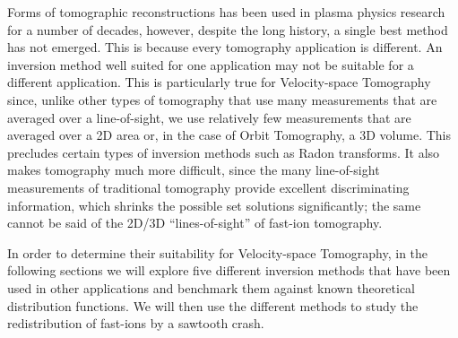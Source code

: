 Forms of tomographic reconstructions has been used in plasma physics research for a number of decades, however,
despite the long history, a single best method has not emerged. This is because every tomography application is different. An inversion method well suited for one application may not be suitable for a different application. This is particularly true for Velocity-space Tomography since, unlike other types of tomography that use many measurements that are averaged over a line-of-sight, we use relatively few measurements that are averaged over a 2D area or, in the case of Orbit Tomography, a 3D volume. This precludes certain types of inversion methods such as Radon transforms. It also makes tomography much more difficult, since the many line-of-sight measurements of traditional tomography provide excellent discriminating information, which shrinks the possible set solutions significantly; the same cannot be said of the 2D/3D ``lines-of-sight'' of fast-ion tomography.

In order to determine their suitability for Velocity-space Tomography, in the following sections we will explore five different inversion methods that have been used in other applications and benchmark them against known theoretical distribution functions. We will then use the different methods to study the redistribution of fast-ions by a sawtooth crash. 

